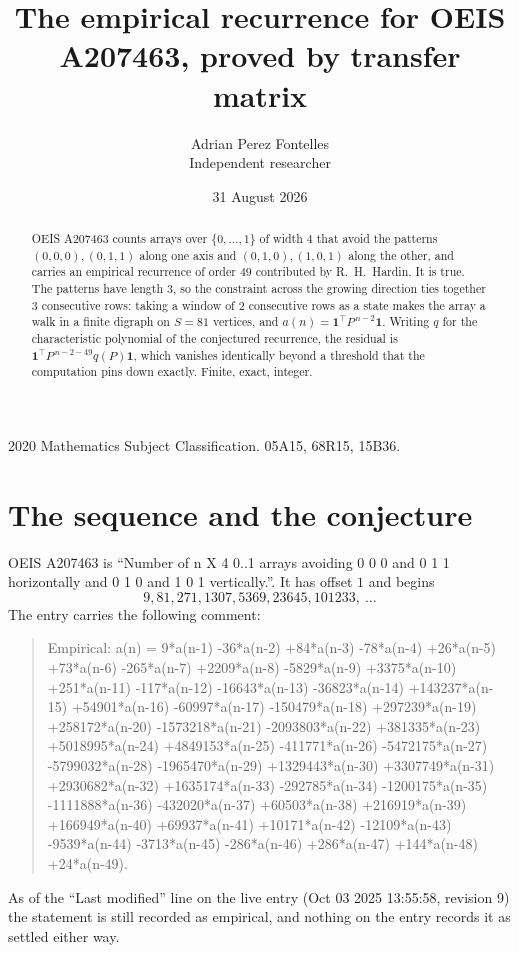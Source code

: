 \documentclass[11pt,a4paper]{article}
\title{The empirical recurrence for OEIS A207463, proved by transfer matrix}
\author{Adrian Perez Fontelles\\ \small Independent researcher}
\date{31 August 2026}
\theoremstyle{plain}
\theoremstyle{definition}
\begin{document}
\maketitle

\begin{abstract}
OEIS A207463 counts arrays over $\{0,\dots,1\}$ of width $4$ that avoid the patterns
$(0,0,0), (0,1,1)$ along one axis and $(0,1,0), (1,0,1)$ along the other, and carries an empirical recurrence of
order $49$ contributed by R.~H.~Hardin. It is true. The patterns have length $3$, so
the constraint across the growing direction ties together $3$ consecutive rows: taking a
window of $2$ consecutive rows as a state makes the array a walk in a finite digraph
on $S=81$ vertices, and $a(n)=\mathbf{1}^{\!\top}P^{\,n-2}\mathbf{1}$. Writing $q$
for the characteristic polynomial of the conjectured recurrence, the residual is
$\mathbf{1}^{\!\top}P^{\,n-2-49}q(P)\mathbf{1}$, which vanishes identically
beyond a threshold that the computation pins down exactly. Finite, exact, integer.
\end{abstract}

\noindent\small 2020 Mathematics Subject Classification. 05A15, 68R15, 15B36.\normalsize

\section{The sequence and the conjecture}

OEIS A207463 is ``Number of n X 4 0..1 arrays avoiding 0 0 0 and 0 1 1 horizontally and 0 1 0 and 1 0 1 vertically.''. It has offset
$1$ and begins
\[
9, 81, 271, 1307, 5369, 23645, 101233,\ \dots
\]
The entry carries the following comment:
\begin{quote}\small
Empirical: a(n) = 9*a(n-1) -36*a(n-2) +84*a(n-3) -78*a(n-4) +26*a(n-5) +73*a(n-6) -265*a(n-7) +2209*a(n-8) -5829*a(n-9) +3375*a(n-10) +251*a(n-11) -117*a(n-12) -16643*a(n-13) -36823*a(n-14) +143237*a(n-15) +54901*a(n-16) -60997*a(n-17) -150479*a(n-18) +297239*a(n-19) +258172*a(n-20) -1573218*a(n-21) -2093803*a(n-22) +381335*a(n-23) +5018995*a(n-24) +4849153*a(n-25) -411771*a(n-26) -5472175*a(n-27) -5799032*a(n-28) -1965470*a(n-29) +1329443*a(n-30) +3307749*a(n-31) +2930682*a(n-32) +1635174*a(n-33) -292785*a(n-34) -1200175*a(n-35) -1111888*a(n-36) -432020*a(n-37) +60503*a(n-38) +216919*a(n-39) +166949*a(n-40) +69937*a(n-41) +10171*a(n-42) -12109*a(n-43) -9539*a(n-44) -3713*a(n-45) -286*a(n-46) +286*a(n-47) +144*a(n-48) +24*a(n-49).
\end{quote}
As of the ``Last modified'' line on the live entry (Oct 03 2025 13:55:58, revision
9) the statement is still recorded as empirical, and nothing on the entry
records it as settled either way.
\end{document}
